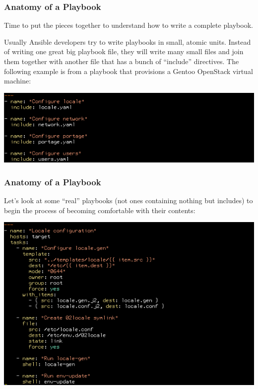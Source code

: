\documentclass[helvetica,english,utf8,notitle,nologo]{beamer}
\begin{document}
\begin{frame}
  \frametitle{Anatomy of a Playbook}

  Time to put the pieces together to understand how to write a
  complete playbook.

  Usually Ansible developers try to write playbooks in small, atomic
  units. Instead of writing one great big playbook file, they will
  write many small files and join them together with another file that
  has a bunch of ``include'' directives. The following example is from
  a playbook that provisions a Gentoo OpenStack virtual machine:

  \includegraphics[scale=0.44]{img_16}
\end{frame}

\begin{frame}
  \frametitle{Anatomy of a Playbook}

  Let's look at some ``real'' playbooks (not ones containing nothing
  but includes) to begin the process of becoming comfortable with
  their contents:

  \includegraphics[scale=0.44]{img_17}
\end{frame}
\end{document}
